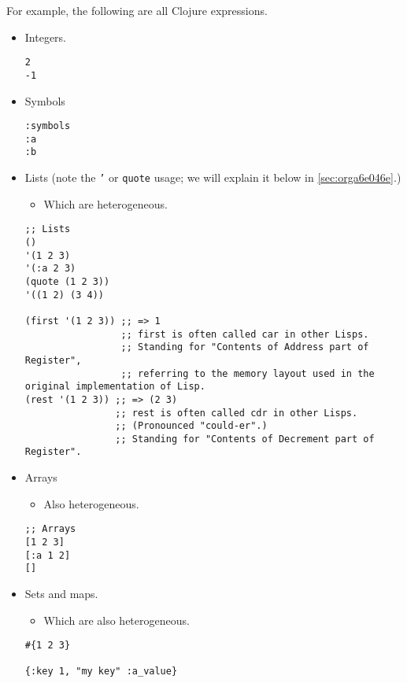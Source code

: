 \documentclass[11pt]{article}
\begin{document}
For example, the following are all Clojure expressions.
\begin{itemize}
\item Integers.
\begin{verbatim}
2
-1
\end{verbatim}
\item Symbols
\begin{verbatim}
:symbols
:a
:b
\end{verbatim}

\item Lists (note the \texttt{'} or \texttt{quote} usage; we will explain it below in \ref{sec:orga6e046e}.)
\begin{itemize}
\item Which are heterogeneous.
\end{itemize}
\begin{verbatim}
;; Lists
()
'(1 2 3)
'(:a 2 3)
(quote (1 2 3))
'((1 2) (3 4))

(first '(1 2 3)) ;; => 1
                 ;; first is often called car in other Lisps.
                 ;; Standing for "Contents of Address part of Register",
                 ;; referring to the memory layout used in the original implementation of Lisp.
(rest '(1 2 3)) ;; => (2 3)
                ;; rest is often called cdr in other Lisps.
                ;; (Pronounced "could-er".)
                ;; Standing for "Contents of Decrement part of Register".
\end{verbatim}

\item Arrays
\begin{itemize}
\item Also heterogeneous.
\end{itemize}
\begin{verbatim}
;; Arrays
[1 2 3]
[:a 1 2]
[]
\end{verbatim}

\item Sets and maps.
\begin{itemize}
\item Which are also heterogeneous.
\end{itemize}
\begin{verbatim}
#{1 2 3}

{:key 1, "my key" :a_value}
\end{verbatim}
\end{itemize}
\end{document}
